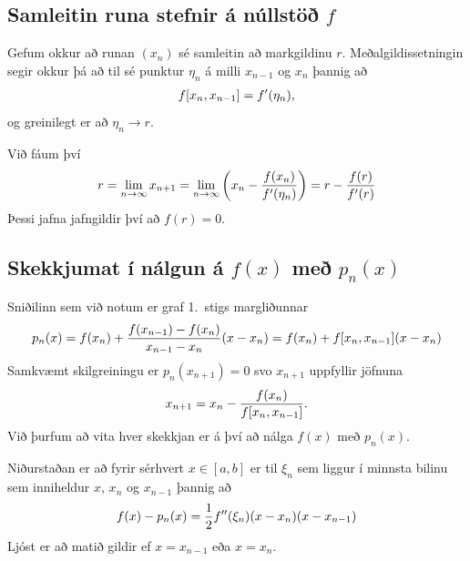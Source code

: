 \documentclass[letterpaper,10pt,icelandic]{sphinxmanual}
\begin{document}
\subsection{Samleitin runa stefnir á núllstöð \(f\)}
\label{kafli02:samleitin-runa-stefnir-a-nullsto}
Gefum okkur að runan \((x_n)\) sé samleitin að markgildinu
\(r\). Meðalgildissetningin segir okkur þá að til sé punktur
\(\eta_n\) á milli \(x_{n-1}\) og \(x_n\) þannig að
\begin{gather}
\begin{split}f[x_n,x_{n-1}]=f'(\eta_n),\end{split}\notag
\end{gather}
og greinilegt er að \(\eta_n\to r\).

Við fáum því
\begin{gather}
\begin{split}r=\lim_{n\to \infty}x_{n+1}=\lim_{n\to \infty}
\bigg(x_n-\dfrac{f(x_n)}{f'(\eta_n)}\bigg) =r-\dfrac{f(r)}{f'(r)}\end{split}\notag
\end{gather}
Þessi jafna jafngildir því að \(f(r)=0\).


\subsection{Skekkjumat í nálgun á \(f(x)\) með \(p_n(x)\)}
\label{kafli02:skekkjumat-i-nalgun-a-me}
Sniðilinn sem við notum er graf 1. stigs margliðunnar
\begin{gather}
\begin{split}p_n(x) = f(x_n) +
        \dfrac{f(x_{n-1})-f(x_n)}{x_{n-1}-x_n}(x-x_n)
        = f(x_n) + f[x_n,x_{n-1}](x-x_n)\end{split}\notag
\end{gather}
Samkvæmt skilgreiningu er \(p_n(x_{n+1}) = 0\) svo \(x_{n+1}\)
uppfyllir jöfnuna
\begin{gather}
\begin{split}x_{n+1} = x_n - \frac{f(x_n)}{f[x_n,x_{n-1}]}.\end{split}\notag
\end{gather}
Við þurfum að vita hver skekkjan er á því að nálga \(f(x)\) með
\(p_n(x)\).

Niðurstaðan er að fyrir sérhvert \(x \in [a,b]\) er til
\(\xi_n\) sem liggur í minnsta bilinu sem inniheldur \(x\),
\(x_n\) og \(x_{n-1}\) þannig að
\begin{gather}
\begin{split}f(x) - p_n(x) = \frac{1}{2}f''(\xi_n)(x-x_n)(x-x_{n-1})\end{split}\notag
\end{gather}
Ljóst er að matið gildir ef \(x=x_{n-1}\) eða \(x=x_n\).
\end{document}
